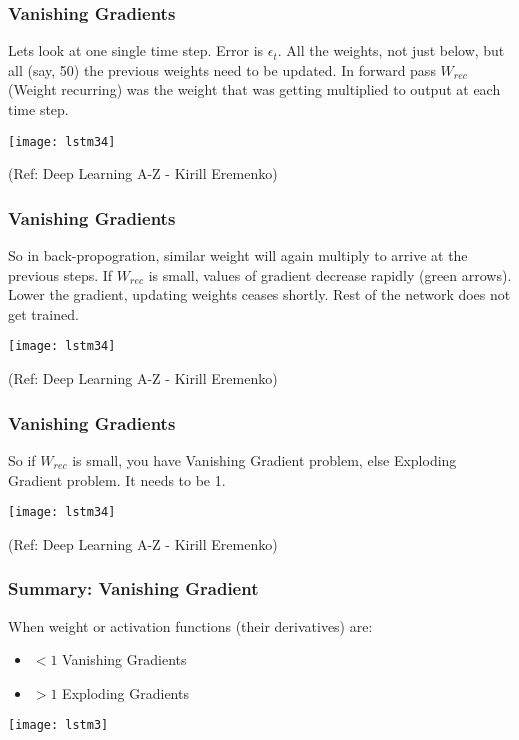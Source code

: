 \begin{frame}[fragile] \frametitle{Vanishing Gradients}

Lets look at one single time step. Error is $\epsilon_t$. All the weights, not just below, but all (say, 50) the previous weights need to be updated. In forward pass $W_{rec}$ (Weight recurring) was the weight that was getting multiplied to output at each time step.
\begin{center}
\texttt{[image: lstm34]}

\tiny{(Ref: Deep Learning A-Z - Kirill Eremenko)}
\end{center}

\end{frame}

\begin{frame}[fragile] \frametitle{Vanishing Gradients}
So in back-propogration, similar weight will again multiply to arrive at the previous steps. If $W_{rec}$ is small, values of gradient decrease rapidly (green arrows). Lower the gradient, updating weights ceases shortly. Rest of the network  does not get trained. 
\begin{center}
\texttt{[image: lstm34]}

\tiny{(Ref: Deep Learning A-Z - Kirill Eremenko)}
\end{center}

\end{frame}


\begin{frame}[fragile] \frametitle{Vanishing Gradients}
So if $W_{rec}$ is small, you have Vanishing Gradient problem, else Exploding Gradient problem. It needs to  be 1.
\begin{center}
\texttt{[image: lstm34]}

\tiny{(Ref: Deep Learning A-Z - Kirill Eremenko)}
\end{center}

\end{frame}


\begin{frame}[fragile] \frametitle{Summary: Vanishing Gradient}
When weight  or activation  functions  (their  derivatives)  are:
\begin{itemize}
\item $< 1$ Vanishing Gradients
\item $> 1$ Exploding Gradients
\end{itemize}
\begin{center}
\texttt{[image: lstm3]}
\end{center}
\end{frame}

